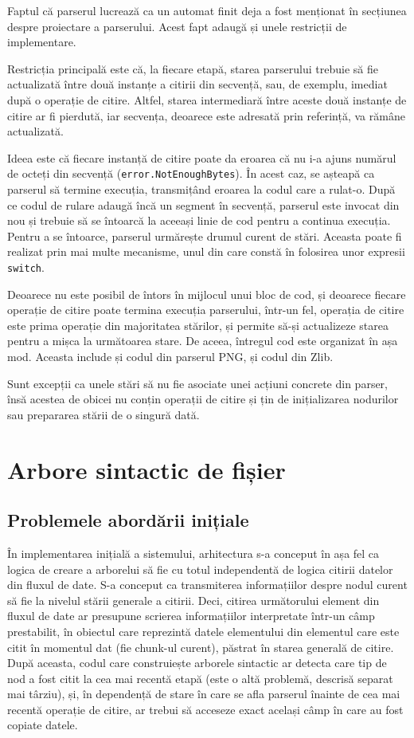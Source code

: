 \documentclass[a4paper,12pt]{report}
\begin{document}
Faptul că parserul lucrează ca un automat finit deja a fost
menționat în secțiunea despre proiectare a parserului.
Acest fapt adaugă și unele restricții de implementare.

Restricția principală este că, la fiecare etapă, starea parserului trebuie să fie actualizată
între două instanțe a citirii din secvență, sau, de exemplu, imediat după o operație de citire.
Altfel, starea intermediară între aceste două instanțe de citire ar fi pierdută,
iar secvența, deoarece este adresată prin referință, va rămâne actualizată.

Ideea este că fiecare instanță de citire poate da eroarea
că nu i-a ajuns numărul de octeți din secvență (\texttt{error.NotEnoughBytes}).
În acest caz, se așteapă ca parserul să termine execuția,
transmițând eroarea la codul care a rulat-o.
După ce codul de rulare adaugă încă un segment în secvență,
parserul este invocat din nou și trebuie să se întoarcă
la aceeași linie de cod pentru a continua execuția.
Pentru a se întoarce, parserul urmărește drumul curent de stări.
Aceasta poate fi realizat prin mai multe mecanisme, unul din care constă în folosirea unor expresii \texttt{switch}.

Deoarece nu este posibil de întors în mijlocul unui bloc de cod,
și deoarece fiecare operație de citire poate termina execuția parserului,
într-un fel, operația de citire este prima operație din majoritatea stărilor,
și permite să-și actualizeze starea pentru a mișca la următoarea stare.
De aceea, întregul cod este organizat în așa mod.
Aceasta include și codul din parserul \ac{PNG}, și codul din Zlib.

Sunt excepții ca unele stări să nu fie asociate unei acțiuni concrete din parser,
însă acestea de obicei nu conțin operații de citire și țin de inițializarea nodurilor
sau prepararea stării de o singură dată.


\section{Arbore sintactic de fișier}

\subsection{Problemele abordării inițiale}

În implementarea inițială a sistemului, arhitectura s-a conceput în așa fel ca
logica de creare a arborelui să fie cu totul independentă de logica citirii datelor din fluxul de date.
S-a conceput ca transmiterea informațiilor despre nodul curent să fie la nivelul stării generale a citirii.
Deci, citirea următorului element din fluxul de date ar presupune scrierea informațiilor interpretate
într-un câmp prestabilit, în obiectul care reprezintă datele elementului
din elementul care este citit în momentul dat (fie chunk-ul curent), păstrat în starea generală de citire.
După aceasta, codul care construiește arborele sintactic ar detecta care tip de nod a fost citit la cea mai recentă etapă 
(este o altă problemă, descrisă separat mai târziu),
și, în dependență de stare în care se afla parserul înainte de cea mai recentă operație de citire,
ar trebui să acceseze exact același câmp în care au fost copiate datele.
\end{document}
